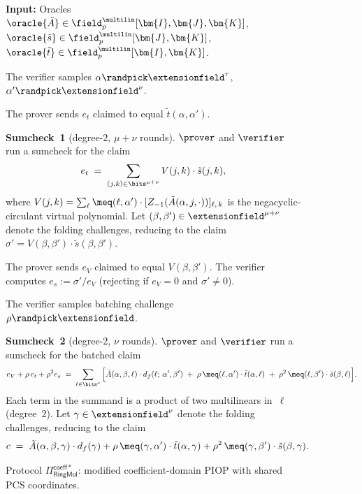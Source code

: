 \begin{figure}[H]
\caption{Protocol $\Pi_{\mathsf{RingMul}}^{\mathsf{coeff*}}$: modified
coefficient-domain PIOP with shared PCS coordinates.}
\label{prot:coeff-modified}
\begin{algorithm}[H]
\textbf{Input:} Oracles
$\oracle{\tilde{A}} \in \field_p^{\multilin}[\bm{I},\bm{J},\bm{K}]$,
$\oracle{\tilde{s}} \in \field_p^{\multilin}[\bm{J},\bm{K}]$,
$\oracle{\tilde{t}} \in \field_p^{\multilin}[\bm{I},\bm{K}]$.

\begin{algorithmic}[1]

\STATE The verifier samples
$\alpha \randpick \extensionfield^\tau$,
$\alpha' \randpick \extensionfield^\nu$.

\STATE \label{step:coeff-et}
The prover sends $e_t$ claimed to equal $\tilde{t}(\alpha, \alpha')$.

\STATE \label{step:coeff-sc1}
\textbf{Sumcheck~1} (degree-$2$, $\mu + \nu$ rounds).
$\prover$ and $\verifier$ run a sumcheck for the claim
\[
    e_t \;=\; \sum_{(j,k) \in \bits^{\mu+\nu}}
    V(j,k) \cdot \tilde{s}(j,k),
\]
where $V(j,k) = \sum_\ell \meq(\ell, \alpha')
\cdot [Z_{-1}(\tilde{A}(\alpha, j, \cdot))]_{\ell,\, k}$
is the negacyclic-circulant virtual polynomial.
Let $(\beta, \beta') \in \extensionfield^{\mu+\nu}$ denote the
folding challenges, reducing to the claim
$\sigma' = V(\beta,\beta') \cdot \tilde{s}(\beta,\beta')$.

\STATE \label{step:coeff-eV}
The prover sends $e_V$ claimed to equal $V(\beta,\beta')$.
The verifier computes $e_s := \sigma' / e_V$
(rejecting if $e_V = 0$ and $\sigma' \neq 0$).

\STATE \label{step:coeff-rho}
The verifier samples batching challenge
$\rho \randpick \extensionfield$.

\STATE \label{step:coeff-sc2}
\textbf{Sumcheck~2} (degree-$2$, $\nu$ rounds).
$\prover$ and $\verifier$ run a sumcheck for the batched claim
\begin{equation}\label{eq:coeff-batched-sc2}
    e_V + \rho\, e_t + \rho^2 e_s
    \;=\;
    \sum_{\ell \in \bits^\nu} \Big[
        \tilde{A}(\alpha,\beta,\ell) \cdot d_f(\ell;\, \alpha',\beta')
        \;+\; \rho\, \meq(\ell,\alpha') \cdot \tilde{t}(\alpha,\ell)
        \;+\; \rho^2\, \meq(\ell,\beta') \cdot \tilde{s}(\beta,\ell)
    \Big].
\end{equation}
Each term in the summand is a product of two multilinears in~$\ell$
(degree~$2$).
Let $\gamma \in \extensionfield^\nu$ denote the folding challenges,
reducing to the claim
\[
    c \;=\;
    \tilde{A}(\alpha,\beta,\gamma) \cdot d_f(\gamma)
    + \rho\, \meq(\gamma,\alpha') \cdot \tilde{t}(\alpha,\gamma)
    + \rho^2\, \meq(\gamma,\beta') \cdot \tilde{s}(\beta,\gamma).
\]


\end{algorithmic}
\end{algorithm}
\end{figure}
